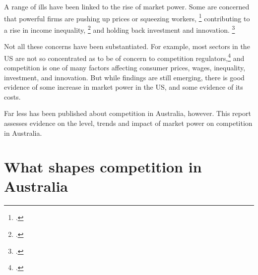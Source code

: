 A range of ills have been linked to the rise of market power. Some are concerned that powerful firms are pushing up prices or squeezing workers,%
\footcite{AutorDorn2017}
contributing to a rise in income inequality,
\footcite{Leigh-triggs-AER}
and holding back investment and innovation.%
\footcites{Econtoohigh2016}{Philippon2017}{CEAcompetitionbriefmay2016}{Economicinnovationgroupdynamism}


Not all these concerns have been substantiated. For example, most sectors in the US are not so concentrated as to be of concern to competition regulators,\footcite{antitrustpopulism} and competition is one of many factors affecting consumer prices, wages, inequality, investment, and innovation.
But while findings are still emerging, there is good evidence of some increase in market power in the US, and some evidence of its costs. 

Far less has been published about competition in Australia, however. This report assesses evidence on the level, trends and impact of market power on competition in Australia. 

\section{What shapes competition in Australia}

